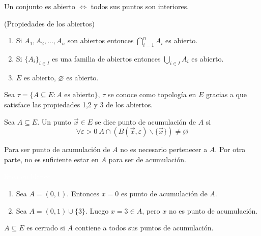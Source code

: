 \begin{proposicion}
Un conjunto es abierto $\Leftrightarrow$ todos sus puntos son interiores.
\end{proposicion}

\begin{proposicion}{\rm (Propiedades de los abiertos)}
\begin{enumerate}
\item Si $A_1,A_2,\ldots,A_n$ son abiertos entonces $\bigcap_{i=1}^n{A_i}$ es abierto.
\item Si $\{A_i\}_{i\in I}$ es una familia de abiertos entonces $\bigcup_{i\in I}{A_i}$ es abierto.
\item $E$ es abierto, $\varnothing$ es abierto.
\end{enumerate}

Sea $\tau =\{A\subseteq E : A \text{ es abierto}\}$, $\tau$ se conoce como topolog\'ia en $E$ gracias a que satisface las propiedades 1,2 y 3 de los abiertos.
\end{proposicion}

\begin{definicion}
Sea $A\subseteq E$. Un punto $\vec{x}\in E$ se dice punto de acumulaci\'on de $A$ si
$$\forall \varepsilon > 0 \: A\cap(B(\vec{x},\varepsilon)\backslash \{\vec{x}\})\neq \varnothing$$
\end{definicion}

\begin{nota}
Para ser punto de acumulaci\'on de $A$ no es necesario pertenecer a $A$. Por otra parte, no es suficiente estar en $A$ para ser de acumulaci\'on.
\end{nota}

\begin{ejemplo}\textcolor{white}{linea en blanco}
\begin{enumerate}
\item Sea $A=(0,1)$. Entonces $x=0$ es punto de acumulaci\'on de $A$.
\item Sea $A=(0,1)\cup\{3\}$. Luego $x=3\in A$, pero $x$ no es punto de acumulaci\'on.
\end{enumerate}
\end{ejemplo}

\begin{definicion} 
$A\subseteq E$ es cerrado si $A$ contiene a todos sus puntos de acumulaci\'on.
\end{definicion}


